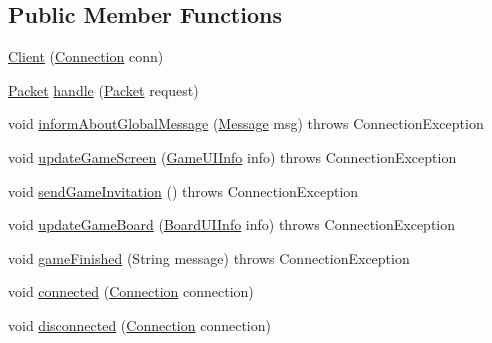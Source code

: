 \subsection*{Public Member Functions}
\begin{DoxyCompactItemize}
\item 
\hyperlink{classpt_1_1up_1_1fe_1_1lpro1613_1_1server_1_1conn_1_1_client_a057095008df340effc95b69dbda5b643}{Client} (\hyperlink{classpt_1_1up_1_1fe_1_1lpro1613_1_1sharedlib_1_1conn_1_1_connection}{Connection} conn)
\item 
\hyperlink{classpt_1_1up_1_1fe_1_1lpro1613_1_1sharedlib_1_1conn_1_1_packet}{Packet} \hyperlink{classpt_1_1up_1_1fe_1_1lpro1613_1_1server_1_1conn_1_1_client_a81efbd1e6b06189da5c814ac767a4a98}{handle} (\hyperlink{classpt_1_1up_1_1fe_1_1lpro1613_1_1sharedlib_1_1conn_1_1_packet}{Packet} request)
\item 
void \hyperlink{classpt_1_1up_1_1fe_1_1lpro1613_1_1server_1_1conn_1_1_client_aea2e952268afe16993958c8affb921cb}{inform\+About\+Global\+Message} (\hyperlink{classpt_1_1up_1_1fe_1_1lpro1613_1_1sharedlib_1_1structs_1_1_message}{Message} msg)  throws Connection\+Exception 
\item 
void \hyperlink{classpt_1_1up_1_1fe_1_1lpro1613_1_1server_1_1conn_1_1_client_ad3cc8b10b942f6260a0e7db7f5a0a538}{update\+Game\+Screen} (\hyperlink{classpt_1_1up_1_1fe_1_1lpro1613_1_1sharedlib_1_1structs_1_1_game_u_i_info}{Game\+U\+I\+Info} info)  throws Connection\+Exception 
\item 
void \hyperlink{classpt_1_1up_1_1fe_1_1lpro1613_1_1server_1_1conn_1_1_client_a2d18ebb9809e36b016e9db24c8274522}{send\+Game\+Invitation} ()  throws Connection\+Exception 
\item 
void \hyperlink{classpt_1_1up_1_1fe_1_1lpro1613_1_1server_1_1conn_1_1_client_a68fc46855fd613c9ca06c32da08c2f5a}{update\+Game\+Board} (\hyperlink{classpt_1_1up_1_1fe_1_1lpro1613_1_1sharedlib_1_1structs_1_1_board_u_i_info}{Board\+U\+I\+Info} info)  throws Connection\+Exception 
\item 
void \hyperlink{classpt_1_1up_1_1fe_1_1lpro1613_1_1server_1_1conn_1_1_client_a58789376953d4b6f316a48627dffbae1}{game\+Finished} (String message)  throws Connection\+Exception 
\item 
void \hyperlink{classpt_1_1up_1_1fe_1_1lpro1613_1_1server_1_1conn_1_1_client_a1cf160e68d7310d9f0b3a53d8b26f80d}{connected} (\hyperlink{classpt_1_1up_1_1fe_1_1lpro1613_1_1sharedlib_1_1conn_1_1_connection}{Connection} connection)
\item 
void \hyperlink{classpt_1_1up_1_1fe_1_1lpro1613_1_1server_1_1conn_1_1_client_a8aaec34bb1c5d5af0430318b105ac3fc}{disconnected} (\hyperlink{classpt_1_1up_1_1fe_1_1lpro1613_1_1sharedlib_1_1conn_1_1_connection}{Connection} connection)
\end{DoxyCompactItemize}


